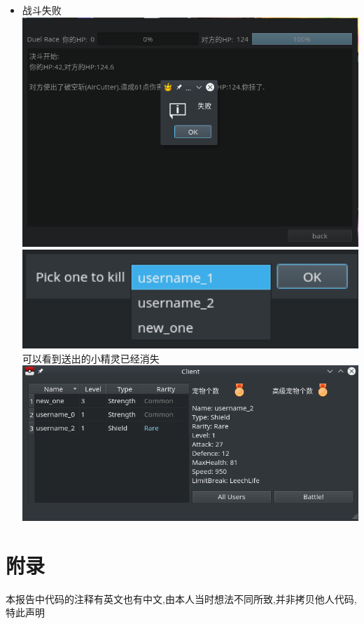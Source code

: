 \documentclass{article}
\begin{document}
\begin{itemize}
\begin{itemize}
\begin{center}
    \end{center}
  \item 战斗失败\\
    \includegraphics[width=14cm]{./pokemon/战斗失败.png}
    \includegraphics[width=14cm]{./pokemon/送出小精灵.png}
    可以看到送出的小精灵已经消失\\
    \includegraphics[width=14cm]{./pokemon/送出后.png}
  \end{itemize}
\end{itemize}

\section{附录}
\label{sec:appendix}
本报告中代码的注释有英文也有中文,由本人当时想法不同所致,并非拷贝他人代码,特此声明
\end{document}

